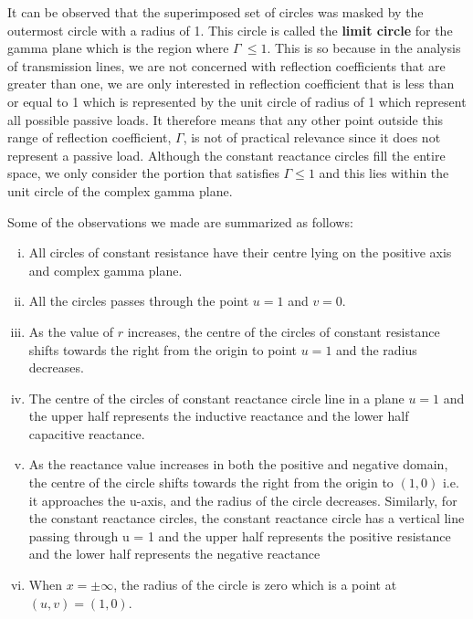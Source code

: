 It can be observed that the superimposed set of circles was masked by the outermost circle with a radius of 1. This circle is called the \textbf{limit circle} for the gamma plane which is the region where $\Gamma\ \leq 1$. This is so because in the analysis of transmission lines, we are not concerned with reflection coefficients that are greater than one, we are only interested in reflection coefficient that is less than or equal to 1 which is represented by the unit circle of radius of 1 which represent all possible passive loads. It therefore means that any other point outside this range of reflection coefficient, $\Gamma$, is not of practical relevance since it does not represent a passive load. Although the constant reactance circles fill the entire space, we only consider the portion that satisfies $ \Gamma\leq 1$ and this lies within the unit circle of the complex gamma plane.

Some of the observations we made are summarized as follows:
\begin{enumerate}[(i)]
\item All circles of constant resistance have their centre lying on the positive axis and complex gamma plane.
\item All the circles passes through the point $u = 1$ and $v = 0$.
\item As the value of $r$ increases, the centre of the circles of constant resistance shifts towards the right from the origin to point $u = 1$ and the radius decreases.
\item The centre of the circles of constant reactance circle line in a plane $u = 1$ and the upper half represents the inductive reactance and the lower half capacitive reactance.
\item As the reactance value increases in both the positive and negative domain, the centre of the circle shifts towards the right from the origin to  $(1, 0)$ i.e. it approaches the u-axis, and the radius of the circle decreases. Similarly, for the constant reactance circles, the constant reactance circle has a vertical line passing through u = 1 and the upper half represents the positive resistance and the lower half represents the negative reactance
\item When $x = \pm\infty$, the radius of the circle is zero which is a point at $(u,v) = (1,0)$.
\end{enumerate}

